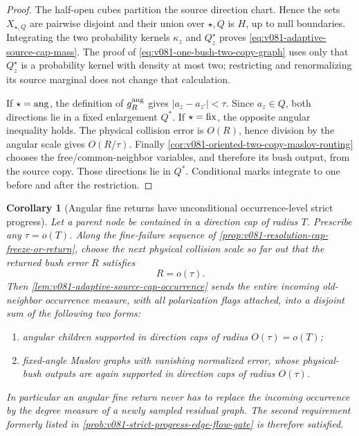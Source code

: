 \documentclass[10pt]{article}
\newtheorem{corollary}[theorem]{Corollary}
\begin{document}
\begin{proof}
The half-open cubes partition the source direction chart.  Hence the sets
\(X_{\star,Q}\) are pairwise disjoint and their union over \(\star,Q\) is \(H\), up to null
boundaries.  Integrating the two probability kernels \(\kappa_z\) and \(Q_z^\star\) proves
\eqref{eq:v081-adaptive-source-cap-mass}.  The proof of
\eqref{eq:v081-one-bush-two-copy-graph} uses only that \(Q_z^\star\) is a probability kernel with
density at most two; restricting and renormalizing its source marginal does not change that
calculation.

If \(\star={\rm ang}\), the definition of \(g_R^{\rm ang}\) gives
\(|a_z-a_{z'}|<\tau\).  Since \(a_z\in Q\), both directions lie in a fixed enlargement \(Q^*\).
If \(\star={\rm fix}\), the opposite angular inequality holds.  The physical collision error is
\(O(R)\), hence division by the angular scale gives \(O(R/\tau)\).  Finally
\cref{cor:v081-oriented-two-copy-maslov-routing} chooses the free/common-neighbor variables, and
therefore its bush output, from the source copy.  Those directions lie in \(Q^*\).  Conditional
marks integrate to one before and after the restriction.
\end{proof}

\begin{corollary}[Angular fine returns have unconditional occurrence-level strict progress]
\label{cor:v081-angular-old-occurrence-strict-progress}
Let a parent node be contained in a direction cap of radius \(T\).  Prescribe any
\(\tau=o(T)\).  Along the fine-failure sequence of
\cref{prop:v081-resolution-cap-freeze-or-return}, choose the next physical collision scale so far
out that the returned bush error \(R\) satisfies
\[
R=o(\tau).
\]
Then \cref{lem:v081-adaptive-source-cap-occurrence} sends the entire incoming old-neighbor
occurrence measure, with all polarization flags attached, into a disjoint sum of the following two
forms:
\begin{enumerate}[label=\textnormal{(\roman*)}]
\item angular children supported in direction caps of radius \(O(\tau)=o(T)\);
\item fixed-angle Maslov graphs with vanishing normalized error, whose physical-bush outputs are
again supported in direction caps of radius \(O(\tau)\).
\end{enumerate}
In particular an angular fine return never has to replace the incoming occurrence by the degree
measure of a newly sampled residual graph.  The second requirement formerly listed in
\cref{prob:v081-strict-progress-edge-flow-gate} is therefore satisfied.
\end{corollary}
\end{document}

